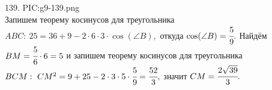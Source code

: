 139. {{PIC:g9-139.png}}\\
Запишем теорему косинусов для треугольника $ABC:\ 25=36+9-2\cdot6\cdot3\cdot\cos(\angle B),$ откуда $\cos(\angle B)=\cfrac{5}{9}.$ Найдём $BM=\cfrac{5}{6}\cdot6=5$ и запишем теорему косинусов для треугольника $BCM:\ CM^2=9+25-2\cdot3\cdot5\cdot\cfrac{5}{9}=\cfrac{52}{3},$ значит $CM=\cfrac{2\sqrt{39}}{3}.$\\
